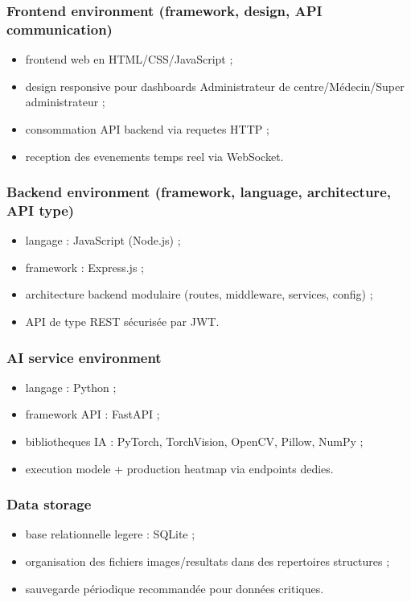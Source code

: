 \subsubsection*{Frontend environment (framework, design, API communication)}
\begin{itemize}
    \item frontend web en HTML/CSS/JavaScript ;
    \item design responsive pour dashboards Administrateur de centre/Médecin/Super administrateur ;
    \item consommation API backend via requetes HTTP ;
    \item reception des evenements temps reel via WebSocket.
\end{itemize}

\subsubsection*{Backend environment (framework, language, architecture, API type)}
\begin{itemize}
    \item langage : JavaScript (Node.js) ;
    \item framework : Express.js ;
    \item architecture backend modulaire (routes, middleware, services, config) ;
    \item API de type REST sécurisée par JWT.
\end{itemize}

\subsubsection*{AI service environment}
\begin{itemize}
    \item langage : Python ;
    \item framework API : FastAPI ;
    \item bibliotheques IA : PyTorch, TorchVision, OpenCV, Pillow, NumPy ;
    \item execution modele + production heatmap via endpoints dedies.
\end{itemize}

\subsubsection*{Data storage}
\begin{itemize}
    \item base relationnelle legere : SQLite ;
    \item organisation des fichiers images/resultats dans des repertoires structures ;
    \item sauvegarde périodique recommandée pour données critiques.
\end{itemize}

